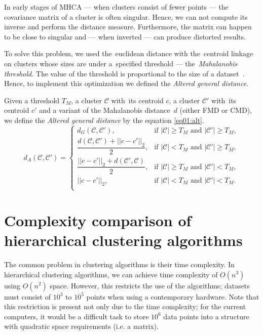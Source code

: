 In early stages of MHCA --- when clusters consist of fewer points --- the covariance matrix of a cluster is often singular. Hence, we can not compute its inverse and perform the distance measure. Furthermore, the matrix can happen to be close to singular and --- when inverted --- can produce distorted results.

To solve this problem, we used the~euclidean distance with the~centroid linkage on clusters whose sizes are under a~specified threshold --- the~\emph{Mahalanobis threshold}. The value of the threshold is proportional to the size of a dataset~\cite{fivser2012detection}. Hence, to implement this optimization we defined the \emph{Altered general distance}.

\begin{defn}
	Given a threshold $T_M$, a cluster $\mathcal{C}$ with~its centroid $c$, a cluster $\mathcal{C}'$ with~its centroid $c'$ and a variant of the Mahalanobis distance~$d$ (either FMD or CMD), we define the \emph{Altered general distance} by the equation \ref{eq01:alt}.
	\begin{equation}
	d_A(\mathcal{C},\mathcal{C}')=
	\begin{cases}
	d_G(\mathcal{C}, \mathcal{C}'), & \text{if $|\mathcal{C}|\ge T_M$ and $|\mathcal{C}'|\ge T_M$},\\
	\dfrac{d(\mathcal{C}, \mathcal{C}')+||c-c'||_2}{2}, & \text{if $|\mathcal{C}| < T_M$ and $|\mathcal{C}'|\ge T_M$},\\
	\dfrac{||c-c'||_2+d(\mathcal{C}', \mathcal{C})}{2}, & \text{if $|\mathcal{C}|\ge T_M$ and $|\mathcal{C}'|< T_M$},\\
	||c-c'||_2, & \text{if $|\mathcal{C}|< T_M$ and $|\mathcal{C}'|< T_M$}.\\
	\end{cases}
	\label{eq01:alt}
	\end{equation}
	\label{def01:alt}
\end{defn}



\section{Complexity comparison of hierarchical clustering algorithms }

The common problem in clustering algorithms is their time complexity. In hierarchical clustering algorithms, we can achieve time complexity of $O(n^3)$ using $O(n^2)$ space. However, this restricts the use of the algorithms; datasets must consist of $10^3$ to $10^5$ points when using a contemporary hardware. Note that this restriction is present not only due to the time complexity; for the current computers, it would be a difficult task to store $10^6$ data points into a structure with quadratic space requirements (i.e. a matrix).

